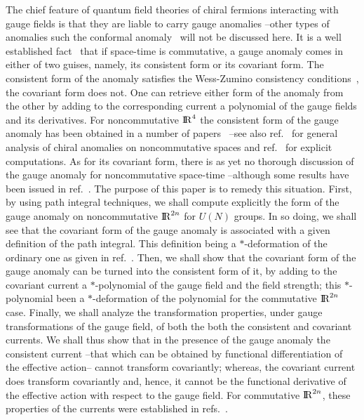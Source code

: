 \documentclass[a4paper,12pt]{article}
\def\RR{{\rm I\!\!\, R}}
\begin{document}
The chief feature of quantum field theories of chiral fermions interacting 
with gauge fields is that they are liable to carry gauge anomalies --other 
types of anomalies such the conformal anomaly~\cite{Nakajima:2001uh} will not 
be discussed here.
It is a well 
established fact~\cite{Alvarez-Gaume:1984cs, Fujikawa:1984bg, Bardeen:1984pm,  
Alvarez-Gaume:1985dr, Fujikawa:1985pt, Banerjee:1986bu, Banerjee:1999up}
 that if space-time is  
commutative, a gauge anomaly comes in either of two guises, namely,
its consistent form or its covariant form. The consistent form of the anomaly
satisfies the Wess-Zumino consistency conditions~\cite{Wess:1971yu},  
the covariant form does not.
One can retrieve  either form of the anomaly from the other by adding 
to the corresponding current a polynomial of the gauge fields and its 
derivatives. For noncommutative $\RR^4$ the consistent form of the gauge 
anomaly has been obtained in a number of papers~\cite{Gracia-Bondia:2000pz, Bonora:2000he, Grisaru:2001sk} --see also 
ref.~\cite{Langmann:1995ub, Perrot:1999vc, Harvey:2001pd} for general 
analysis of chiral anomalies on noncommutative spaces and 
ref.~\cite{Ardalan:2001cy, Ardalan:2000qk} for explicit computations. 
As for its covariant form, there is as yet no thorough discussion of the
gauge anomaly for noncommutative space-time --although some results have 
been issued in ref.~\cite{Martin:2001wc}. The purpose of this paper is to
remedy this situation. First, by using path integral techniques,  we shall   
compute explicitly the form of the gauge anomaly on noncommutative 
$\RR^{2 n}$ for $U(N)$ groups. In so doing, we shall see that the covariant 
form of the gauge anomaly is associated with a given 
definition of the path integral. This definition being a $*\!$-deformation of
the ordinary one as given in ref.~\cite{Fujikawa:1984bg, Banerjee:1986bu, 
 Banerjee:1999up}. Then, we
shall show that the covariant form of the gauge anomaly can be turned 
into the  consistent form of it, by adding to the covariant 
current a $*\!$-polynomial of the gauge field and the field strength; this 
$*\!$-polynomial been a $*\!$-deformation of the polynomial for the commutative 
$\RR^{2 n}$ case. Finally, we shall analyze the transformation properties, 
under gauge transformations of the gauge field, of both
the  both the consistent and covariant currents. We shall thus show that 
in the presence of the gauge anomaly the consistent current --that which 
can be obtained by functional differentiation of the effective action--  cannot 
transform covariantly; whereas, the covariant current does transform 
covariantly and, hence,  it cannot be  the functional derivative  of 
the effective action with respect to the gauge field. 
For  commutative $\RR^{2 n}$, these properties of the currents were 
established in refs.~\cite{Bardeen:1984pm, Alvarez-Gaume:1985dr, Banerjee:1986bu, Banerjee:1999up}.
\end{document}
